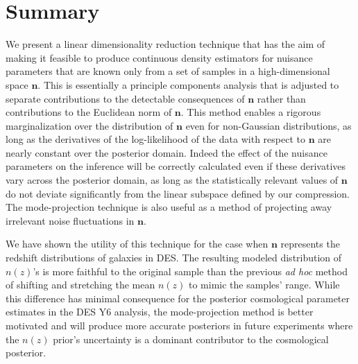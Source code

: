 \documentclass[onecolumn]{aastex7}
\newcommand{\vecn}{\ensuremath{\mathbf{n}}}
\begin{document}
\section{Summary}
  We present a linear dimensionality reduction technique that has the
  aim of making it feasible to produce continuous density estimators
  for nuisance parameters that are known only from a set of samples in
  a high-dimensional space $\vecn.$  This is essentially a principle
  components analysis that is adjusted to separate contributions to
  the detectable consequences of $\vecn$ rather than contributions to
  the Euclidean norm of $\vecn.$   This method enables a rigorous
  marginalization over the distribution of $\vecn$ even for
  non-Gaussian distributions, as long as the derivatives of the
  log-likelihood of the data with respect to $\vecn$ are nearly
  constant over the posterior domain.  Indeed the effect of the
  nuisance parameters on the inference will be correctly calculated
  even if these derivatives vary across the posterior domain, as long
  as the statistically relevant values of $\vecn$ do not deviate
  significantly from the linear subspace defined by our compression.
The mode-projection technique
  is also useful as a method of projecting away irrelevant
  noise fluctuations in $\vecn.$

  We have shown the utility of this technique for the case when
  $\vecn$ represents the redshift distributions of galaxies in DES.
  The resulting modeled distribution of $n(z)$'s is more faithful to
  the original sample than the previous \textit{ad hoc} method of
  shifting and stretching the mean $n(z)$ to mimic the samples'
  range.  While this difference has minimal consequence for the
  posterior cosmological parameter estimates in the DES Y6 analysis,
  the mode-projection method is better motivated and will produce more
  accurate posteriors in future experiments where the $n(z)$
  prior's uncertainty is a dominant contributor to the cosmological posterior.
\end{document}
